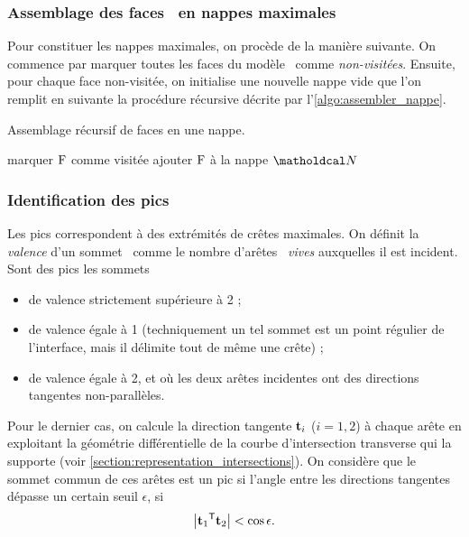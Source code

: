 \subsubsection{Assemblage des faces \brep\ en nappes maximales}
Pour constituer les nappes maximales, on procède de la manière suivante. 
On commence par marquer toutes les faces du modèle \brep\ comme \textit{non-visitées}. 
Ensuite, pour chaque face non-visitée, on initialise une nouvelle nappe vide que l'on remplit en suivante la procédure récursive décrite par l'\autoref{algo:assembler_nappe}.

\begin{algorithm}
	\caption{Assemblage récursif de faces en une nappe.}\label{algo:assembler_nappe}
	\begin{algorithmic}[1]
			\State marquer $\mathrm{F}$ comme visitée
			\State ajouter $\mathrm{F}$ à la nappe $\nappe$
						\State {}
					\EndIf
				\EndFor
			\EndFor
		\EndProcedure
	\end{algorithmic}
\end{algorithm}


\subsubsection{Identification des pics}
Les pics correspondent à des extrémités de crêtes maximales. 
On définit la \textit{valence} d'un sommet \brep\ comme le nombre d'arêtes \brep\ \textit{vives} auxquelles il est incident. 
Sont des pics les sommets
\begin{itemize}
	\item de valence strictement supérieure à 2 ;
	\item de valence égale à 1 (techniquement un tel sommet est un point régulier de l'interface, mais il délimite tout de même une crête) ;
	\item de valence égale à 2, et où les deux arêtes incidentes ont des directions tangentes non-parallèles.
\end{itemize}

Pour le dernier cas, on calcule la direction tangente $\mathbf{t}_i$ ($i = 1,2$) à chaque arête en exploitant la géométrie différentielle de la courbe d'intersection transverse qui la supporte (voir \autoref{section:representation_intersections}). 
On considère que le sommet commun de ces arêtes est un pic si l'angle entre les directions tangentes dépasse un certain seuil $\epsilon$, \ie si 
\begin{equation}
	\left| {\mathbf{t}_1} ^\mathsf{T} {\mathbf{t}_2} \right| < \cos \epsilon.
\end{equation}



